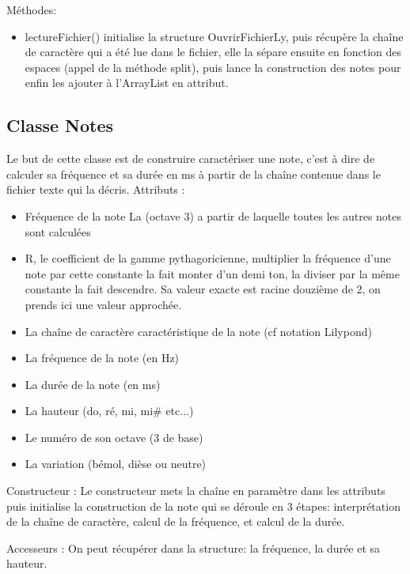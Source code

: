 \documentclass{EPUProjetPeiP}
\begin{document}
Méthodes:
\begin{itemize}
\item lectureFichier() initialise la structure OuvrirFichierLy, puis récupère la chaîne de caractère qui a été lue dans le fichier, elle la sépare ensuite en fonction des espaces (appel de la méthode split), puis lance la construction des notes pour enfin les ajouter à l'ArrayList en attribut.
\end{itemize}

\subsection{Classe Notes}

Le but de cette classe est de construire caractériser une note, c'est à dire de calculer sa fréquence et sa durée en ms à partir de la chaîne contenue dans le fichier texte qui la décris.
Attributs :
\begin{itemize}
\item Fréquence de la note La (octave 3) a partir de laquelle toutes les autres notes sont calculées
\item R, le coefficient de la gamme pythagoricienne, multiplier la fréquence d'une note par cette constante la fait monter d'un demi ton, la diviser par la même constante la fait descendre. Sa valeur exacte est racine douzième de 2, on prends ici une valeur approchée.
\item La chaîne de caractère caractéristique de la note (cf notation Lilypond)
\item La fréquence de la note (en Hz)
\item La durée de la note (en ms)
\item La hauteur (do, ré, mi, mi\# etc...)
\item Le numéro de son octave (3 de base)
\item La variation (bémol, dièse ou neutre)
\end{itemize}

Constructeur :
Le constructeur mets la chaîne en paramètre dans les attributs puis initialise la construction de la note qui se déroule en 3 étapes: interprétation de la chaîne de caractère, calcul de la fréquence, et calcul de la durée.

Accesseurs :
On peut récupérer dans la structure: la fréquence, la durée et sa hauteur.
\end{document}
